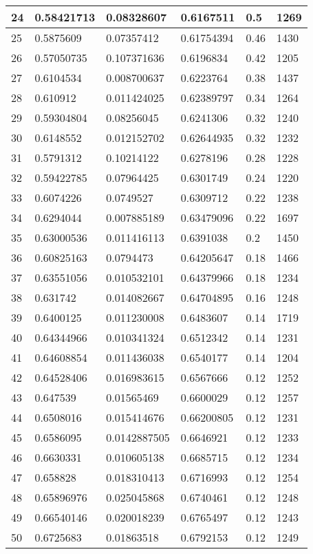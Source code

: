 \begin{longtable}{|l|l|l|l|l|l|}
24 & 0.58421713 & 0.08328607 & 0.6167511 & 0.5 & 1269 \\ \hline 
25 & 0.5875609 & 0.07357412 & 0.61754394 & 0.46 & 1430 \\ \hline 
26 & 0.57050735 & 0.107371636 & 0.6196834 & 0.42 & 1205 \\ \hline 
27 & 0.6104534 & 0.008700637 & 0.6223764 & 0.38 & 1437 \\ \hline 
28 & 0.610912 & 0.011424025 & 0.62389797 & 0.34 & 1264 \\ \hline 
29 & 0.59304804 & 0.08256045 & 0.6241306 & 0.32 & 1240 \\ \hline 
30 & 0.6148552 & 0.012152702 & 0.62644935 & 0.32 & 1232 \\ \hline 
31 & 0.5791312 & 0.10214122 & 0.6278196 & 0.28 & 1228 \\ \hline 
32 & 0.59422785 & 0.07964425 & 0.6301749 & 0.24 & 1220 \\ \hline 
33 & 0.6074226 & 0.0749527 & 0.6309712 & 0.22 & 1238 \\ \hline 
34 & 0.6294044 & 0.007885189 & 0.63479096 & 0.22 & 1697 \\ \hline 
35 & 0.63000536 & 0.011416113 & 0.6391038 & 0.2 & 1450 \\ \hline 
36 & 0.60825163 & 0.0794473 & 0.64205647 & 0.18 & 1466 \\ \hline 
37 & 0.63551056 & 0.010532101 & 0.64379966 & 0.18 & 1234 \\ \hline 
38 & 0.631742 & 0.014082667 & 0.64704895 & 0.16 & 1248 \\ \hline 
39 & 0.6400125 & 0.011230008 & 0.6483607 & 0.14 & 1719 \\ \hline 
40 & 0.64344966 & 0.010341324 & 0.6512342 & 0.14 & 1231 \\ \hline 
41 & 0.64608854 & 0.011436038 & 0.6540177 & 0.14 & 1204 \\ \hline 
42 & 0.64528406 & 0.016983615 & 0.6567666 & 0.12 & 1252 \\ \hline 
43 & 0.647539 & 0.01565469 & 0.6600029 & 0.12 & 1257 \\ \hline 
44 & 0.6508016 & 0.015414676 & 0.66200805 & 0.12 & 1231 \\ \hline 
45 & 0.6586095 & 0.0142887505 & 0.6646921 & 0.12 & 1233 \\ \hline 
46 & 0.6630331 & 0.010605138 & 0.6685715 & 0.12 & 1234 \\ \hline 
47 & 0.658828 & 0.018310413 & 0.6716993 & 0.12 & 1254 \\ \hline 
48 & 0.65896976 & 0.025045868 & 0.6740461 & 0.12 & 1248 \\ \hline 
49 & 0.66540146 & 0.020018239 & 0.6765497 & 0.12 & 1243 \\ \hline 
50 & 0.6725683 & 0.01863518 & 0.6792153 & 0.12 & 1249 \\ \hline 
\end{longtable}